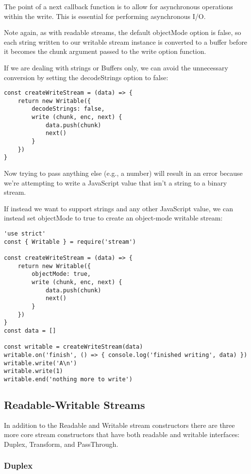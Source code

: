 \documentclass{scrartcl}
\begin{document}
The point of a next callback function is to allow for asynchronous operations within the write. This is essential for performing asynchronous I/O.

Note again, as with readable streams, the default objectMode option is false, so each string written to our writable stream instance is converted to a buffer before it becomes the chunk argument passed to the write option function.

If we are dealing with strings or Buffers only, we can avoid the unnecessary conversion by setting the decodeStrings option to false:

\begin{lstlisting}[style=ES6]
const createWriteStream = (data) => {
    return new Writable({
        decodeStrings: false,
        write (chunk, enc, next) {
            data.push(chunk)
            next()
        }
    })
}
\end{lstlisting}

Now trying to pass anything else (e.g., a number) will result in an error because we're attempting to write a JavaScript value that isn't a string to a binary stream.

If instead we want to support strings and any other JavaScript value, we can instead set objectMode to true to create an object-mode writable stream:

\begin{lstlisting}[style=ES6]
'use strict'
const { Writable } = require('stream')

const createWriteStream = (data) => {
    return new Writable({
        objectMode: true,
        write (chunk, enc, next) {
            data.push(chunk)
            next()
        }
    })
}
const data = []

const writable = createWriteStream(data)
writable.on('finish', () => { console.log('finished writing', data) })
writable.write('A\n')
writable.write(1)
writable.end('nothing more to write')
\end{lstlisting}

\subsection{Readable-Writable Streams}

In addition to the Readable and Writable stream constructors there are three more core stream constructors that have both readable and writable interfaces: Duplex, Transform, and PassThrough.

\subsubsection{Duplex}
\end{document}
